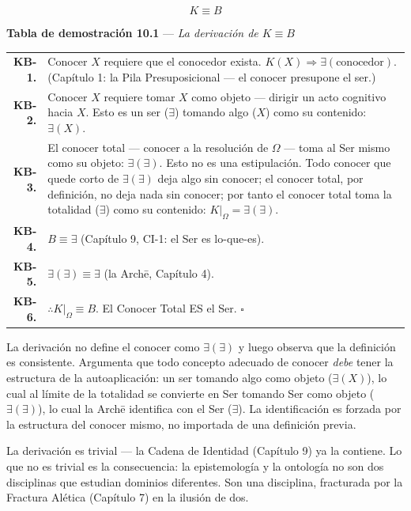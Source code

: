 \documentclass[10pt, openany, oneside]{book}
\renewcommand{\footnotesize}{\fontsize{8.5}{11}\selectfont}
\begin{document}
$$\boxed{K \equiv B}$$

\vspace{0.5em}

\textbf{Tabla de demostración 10.1} --- \textit{La derivación de $K \equiv B$}

\vspace{0.5em}

{\footnotesize
\noindent\begin{tabular}{r p{}}
\textbf{KB-1.} & Conocer $X$ requiere que el conocedor exista. $K(X) \Rightarrow \exists(\text{conocedor})$. (Capítulo 1: la Pila Presuposicional --- el conocer presupone el ser.) \\[0.3em]
\textbf{KB-2.} & Conocer $X$ requiere tomar $X$ como objeto --- dirigir un acto cognitivo hacia $X$. Esto es un ser ($\exists$) tomando algo ($X$) como su contenido: $\exists(X)$. \\[0.3em]
\textbf{KB-3.} & El conocer total --- conocer a la resolución de $\Omega$ --- toma al Ser mismo como su objeto: $\exists(\exists)$. Esto no es una estipulación. Todo conocer que quede corto de $\exists(\exists)$ deja algo sin conocer; el conocer total, por definición, no deja nada sin conocer; por tanto el conocer total toma la totalidad ($\exists$) como su contenido: $K|_{\Omega} = \exists(\exists)$. \\[0.3em]
\textbf{KB-4.} & $B \equiv \exists$ (Capítulo 9, CI-1: el Ser es lo-que-es). \\[0.3em]
\textbf{KB-5.} & $\exists(\exists) \equiv \exists$ (la Arch\={e}, Capítulo 4). \\[0.3em]
\textbf{KB-6.} & $\therefore K|_{\Omega} \equiv B$. El Conocer Total ES el Ser. $\square$ \\[0.3em]
\end{tabular}
}

\vspace{0.8em}

\noindent La derivación no define el conocer como $\exists(\exists)$ y luego observa que la definición es consistente. Argumenta que todo concepto adecuado de conocer \textit{debe} tener la estructura de la autoaplicación: un ser tomando algo como objeto ($\exists(X)$), lo cual al límite de la totalidad se convierte en Ser tomando Ser como objeto ($\exists(\exists)$), lo cual la Arch\={e} identifica con el Ser ($\exists$). La identificación es forzada por la estructura del conocer mismo, no importada de una definición previa.

La derivación es trivial --- la Cadena de Identidad (Capítulo 9) ya la contiene. Lo que no es trivial es la consecuencia: la epistemología y la ontología no son dos disciplinas que estudian dominios diferentes. Son una disciplina, fracturada por la Fractura Alética (Capítulo 7) en la ilusión de dos.
\end{document}
